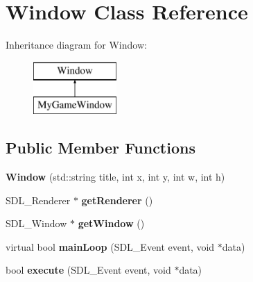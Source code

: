 \hypertarget{classWindow}{}\section{Window Class Reference}
\label{classWindow}
Inheritance diagram for Window\+:\begin{figure}[H]
\begin{center}
\leavevmode
\includegraphics[height=2.000000cm]{classWindow}
\end{center}
\end{figure}
\subsection*{Public Member Functions}
\begin{DoxyCompactItemize}
\item 
\hypertarget{classWindow_a8271c9f315c759d47ec216788ed561e6}{}{\bfseries Window} (std\+::string title, int x, int y, int w, int h)\label{classWindow_a8271c9f315c759d47ec216788ed561e6}

\item 
\hypertarget{classWindow_ad2d885e1e64c00ae20850ee4d1353135}{}S\+D\+L\+\_\+\+Renderer $\ast$ {\bfseries get\+Renderer} ()\label{classWindow_ad2d885e1e64c00ae20850ee4d1353135}

\item 
\hypertarget{classWindow_a58daf43e03ac44a5685a2208faf3f53f}{}S\+D\+L\+\_\+\+Window $\ast$ {\bfseries get\+Window} ()\label{classWindow_a58daf43e03ac44a5685a2208faf3f53f}

\item 
\hypertarget{classWindow_ac8cff5784b0507a91111281c62c9b5c7}{}virtual bool {\bfseries main\+Loop} (S\+D\+L\+\_\+\+Event event, void $\ast$data)\label{classWindow_ac8cff5784b0507a91111281c62c9b5c7}

\item 
\hypertarget{classWindow_a5401a83e70b84e03e84eb07ef9e6e894}{}bool {\bfseries execute} (S\+D\+L\+\_\+\+Event event, void $\ast$data)\label{classWindow_a5401a83e70b84e03e84eb07ef9e6e894}

\end{DoxyCompactItemize}
